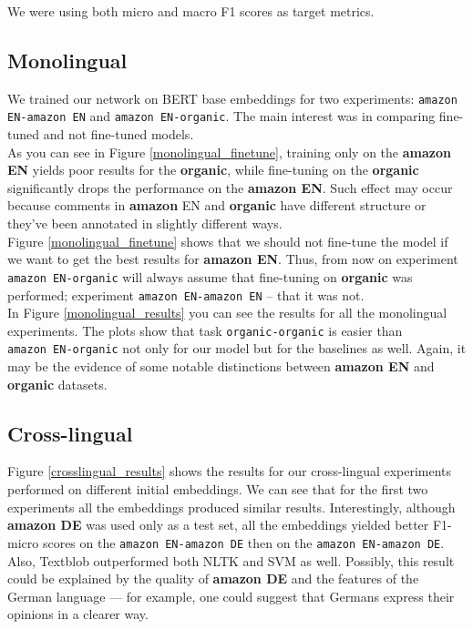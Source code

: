 We were using both micro and macro F1 scores as target metrics.
\subsection{Monolingual}
We trained our network on BERT base embeddings for two experiments: {\tt amazon EN-amazon EN} and {\tt amazon EN-organic}. The main interest was in comparing fine-tuned and not fine-tuned models. \\ 

As you can see in Figure \ref{monolingual_finetune}, training only on the {\bf amazon EN}  yields poor results for the {\bf organic}, while fine-tuning on the {\bf organic} significantly drops the performance on the {\bf amazon EN}. Such effect may occur because comments in {\bf amazon} EN and {\bf organic} have different structure or they've been annotated in slightly different ways. \\
Figure \ref{monolingual_finetune} shows that we should not fine-tune the model if we want to get the best results for {\bf amazon EN}. Thus, from now on experiment {\tt amazon~EN-organic} will always assume that fine-tuning on {\bf organic} was performed; experiment {\tt amazon EN-amazon EN} -- that it was not. \\

In Figure \ref{monolingual_results} you can see the results for all the monolingual experiments. The plots show that task {\tt organic-organic} is easier than {\tt amazon~EN-organic} not only for our model but for the baselines as well. Again, it may be the evidence of some notable distinctions between {\bf amazon EN} and {\bf organic} datasets. \\
\subsection{Cross-lingual}
Figure \ref{crosslingual_results} shows the results for our cross-lingual experiments performed on different initial embeddings. We can see that for the first two experiments all the embeddings produced similar results. Interestingly, although {\bf amazon DE} was used only as a test set, all the embeddings yielded better F1-micro scores on the {\tt amazon EN-amazon DE} then on the {\tt amazon EN-amazon DE}. Also, Textblob outperformed both NLTK and SVM as well. Possibly, this result could be explained by the quality of {\bf amazon DE} and the features of the German language --- for example, one could suggest that Germans express their opinions in a clearer way. \\

